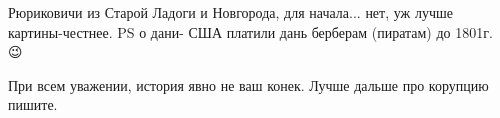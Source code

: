 \begin{itemize}
 
Рюриковичи из Старой Ладоги и Новгорода, для начала... нет, уж лучше картины-честнее. PS о дани- США платили дань берберам (пиратам) до 1801г. 😉

 
При всем уважении, история явно не ваш конек. Лучше дальше про корупцию пишите.

\end{itemize}

